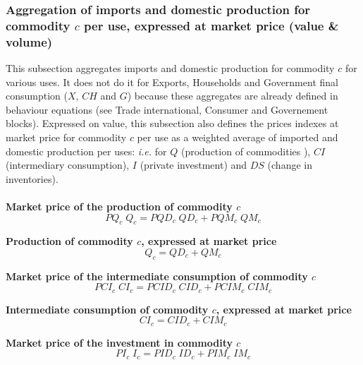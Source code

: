\documentclass[12pt]{article}
\numberwithin{equation}{section}
\begin{document}
\subsubsection{Aggregation of imports and domestic production for commodity $c$ per use, expressed at market price (value \& volume)}


This subsection aggregates imports and domestic production for commodity $c$ for various uses. It does not do it for Exports, Households and Government final consumption ($X$, $CH$ and $G$) because these aggregates are already defined in behaviour equations (see Trade international, Consumer and Governement blocks). Expressed on value, this subsection also defines the prices indexes at market price for commodity $c$ per use as a weighted average of imported and domestic production per uses: \textit{i.e.} for $Q$ (production of commodities ), $CI$ (intermediary consumption), $I$ (private investment) and $DS$ (change in inventories). \\
 \\

\noindent\textbf{Market price of the production of commodity $c$} \\
\begin{dmath}
PQ_{c} \; Q_{c} = PQD_{c} \; QD_{c} + PQM_{c} \; QM_{c}
\end{dmath}

\noindent\textbf{Production of commodity $c$, expressed at market price} \\
\begin{dmath}
Q_{c} = QD_{c} + QM_{c}
\end{dmath}

\noindent\textbf{Market price of the intermediate consumption of commodity $c$} \\
\begin{dmath}
PCI_{c} \; CI_{c} = PCID_{c} \; CID_{c} + PCIM_{c} \; CIM_{c}
\end{dmath}

\noindent\textbf{Intermediate consumption of commodity $c$, expressed at market price} \\
\begin{dmath}
CI_{c} = CID_{c} + CIM_{c}
\end{dmath}

\noindent\textbf{Market price of the investment in commodity $c$} \\
\begin{dmath}
PI_{c} \; I_{c} = PID_{c} \; ID_{c} + PIM_{c} \; IM_{c}
\end{dmath}
\end{document}
